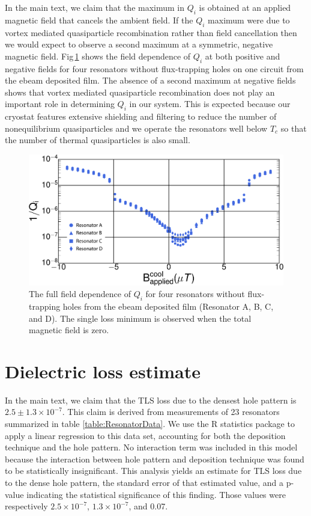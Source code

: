 In the main text, we claim that the maximum in $Q_i$ is obtained at an applied magnetic field that cancels the ambient field.  If the $Q_i$ maximum were due to vortex mediated quasiparticle recombination\cite{nsanzineza2014} rather than field cancellation then we would expect to observe a second maximum at a symmetric, negative magnetic field.   Fig\,\ref{fullfield} shows the field dependence of $Q_i$ at both positive and negative fields for four resonators without flux-trapping holes on one circuit from the ebeam deposited film.  The absence of a second maximum at negative fields shows that vortex mediated quasiparticle recombination does not play an important role in determining $Q_{i}$ in our system.  This is expected because our cryostat features extensive shielding and filtering to reduce the number of nonequilibrium quasiparticles and we operate the resonators well below $T_c$ so that the number of thermal quasiparticles is also small.

\begin{figure}
    \begin{center}
        \includegraphics[width=150mm]{DielectricFluxTrap_Supp_Rev2_fullfield.pdf}
        \caption{The full field dependence of $Q_i$ for four resonators without flux-trapping holes from the ebeam deposited film (Resonator A, B, C, and D).  The single loss minimum is observed when the total magnetic field is zero.}
        \label{fullfield}
    \end{center}
\end{figure}

\section{Dielectric loss estimate}
In the main text, we claim that the TLS loss due to the densest hole pattern is $2.5 \pm 1.3\times 10^{-7}$.  This claim is derived from measurements of 23 resonators summarized in table \ref{table:ResonatorData}.  We use the R statistics package\cite{RStatistics} to apply a linear regression to this data set, accounting for both the deposition technique and the hole pattern.  No interaction term was included in this model because the interaction between hole pattern and deposition technique was found to be statistically insignificant.  This analysis yields an estimate for TLS loss due to the dense hole pattern, the standard error of that estimated value, and a p-value indicating the statistical significance of this finding.  Those values were respectively $2.5\times10^{-7}$, $1.3\times10^{-7}$, and 0.07.

